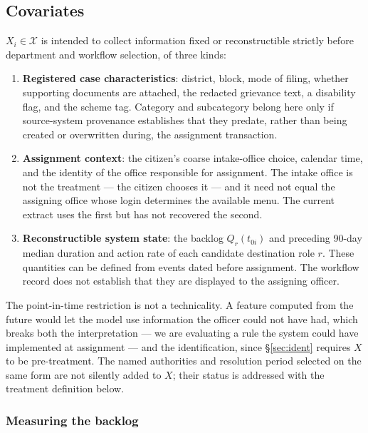 \documentclass[11pt,a4paper]{article}
\theoremstyle{plain}
\theoremstyle{definition}
\theoremstyle{remark}
\begin{document}
\subsection{Covariates}\label{sec:covariates}

$X_i \in \mathcal X$ is intended to collect information fixed or reconstructible strictly
before department and workflow selection, of three kinds:

\begin{enumerate}[leftmargin=*]
\item \textbf{Registered case characteristics}: district, block, mode of filing, whether
supporting documents are attached, the redacted grievance text, a disability flag, and the
scheme tag. Category and subcategory belong here only if source-system provenance establishes
that they predate, rather than being created or overwritten during, the assignment transaction.
\item \textbf{Assignment context}: the citizen's coarse intake-office choice, calendar time,
and the identity of the office responsible for assignment. The intake office is not the
treatment --- the citizen chooses it --- and it need not equal the assigning office whose login
determines the available menu. The current extract uses the first but has not recovered the
second.
\item \textbf{Reconstructible system state}: the backlog $Q_r(t_{0i})$ and preceding 90-day
median duration and action rate of each candidate destination role $r$. These quantities can be
defined from events dated before assignment. The workflow record does not establish that they
are displayed to the assigning officer.
\end{enumerate}

The point-in-time restriction is not a technicality. A feature computed from
the future would let the model use information the officer could not have had, which breaks
both the interpretation --- we are evaluating a rule the system could have implemented at
assignment --- and the identification, since \S\ref{sec:ident} requires $X$ to be
pre-treatment. The named authorities and resolution period selected on the same form are not
silently added to $X$; their status is addressed with the treatment definition below.

\subsubsection{Measuring the backlog}\label{sec:backlog}
\end{document}
